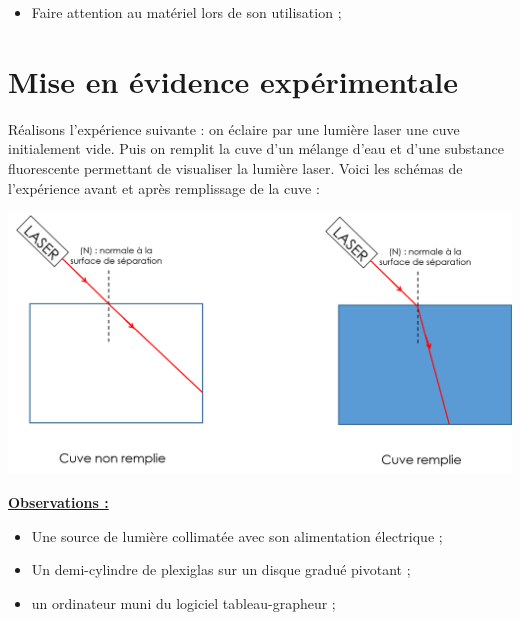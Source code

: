 \begin{tcolorbox}[colback=red!5!white,colframe=red!75!black,title= Consignes :]
\begin{itemize}
    \item Faire attention au matériel lors de son utilisation ;
\end{itemize}
\end{tcolorbox}

\section{Mise en évidence expérimentale}
\begin{tcolorbox}[colback=orange!5!white,colframe=orange!75!black,title= Expérience introductive :]
Réalisons l'expérience suivante : on éclaire par une lumière laser une cuve initialement vide. Puis on remplit la cuve d'un mélange d'eau et d'une substance fluorescente permettant de visualiser la lumière laser. Voici les schémas de l'expérience avant et après remplissage de la cuve :
\begin{center}
    \includegraphics[scale=0.4]{Images/TP/TP9/Experience_intro_correc.png}
\end{center}
\textbf{\underline{Observations :}}

\end{tcolorbox}


\begin{mdframed}[style=autreexo]
\textbf{}
\begin{itemize}
    \item Une source de lumière collimatée avec son alimentation électrique ;
    \item Un demi-cylindre de plexiglas sur un disque gradué pivotant ;
    \item un ordinateur muni du logiciel tableau-grapheur ;
\end{itemize}
\end{mdframed}

